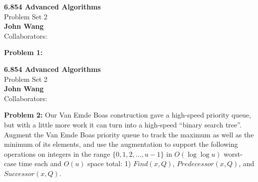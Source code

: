 \documentclass[psamsfonts]{amsart}
\newenvironment{sol}{\vspace{0.25cm}{\large \bfseries Solution:}}{\qedsymbol}
\newenvironment{prob}[1]{\begin{framed}{\large \bfseries Problem #1:}}{\end{framed}}
\newcommand{\makenewtitle}{
\begin{center}
{\huge \bfseries 6.854 Advanced Algorithms} \\
Problem Set 2\\
\vspace{0.25cm}
{\bfseries John Wang} \\
Collaborators:
\end{center}
\vspace{0.5cm}
}
\begin{document}
\makenewtitle
\begin{prob}{1}
\end{prob}

\begin{sol}
\end{sol}

\makenewtitle

\begin{prob}{2}
Our Van Emde Boas construction gave a high-speed priority queue, but with a little more work it can turn into a high-speed ``binary search tree''. Augment the Van Emde Boas priority queue to track the maximum as well as the minimum of its elements, and use the augmentation to support the following operations on integers in the range $\{0,1,2,\ldots, u-1\}$ in $O(\log \log u)$ worst-case time each and $O(u)$ space total: 1) $Find(x, Q)$, $Predecessor(x, Q)$, and $Successor(x,Q)$. 
\end{prob}
\end{document}
